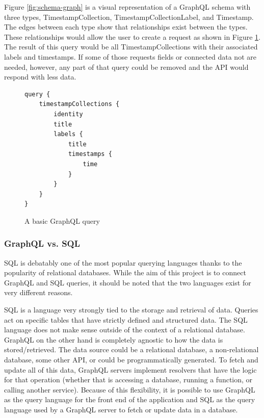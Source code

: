 Figure \ref{fig:schema-graph} is a visual representation of a GraphQL schema with three types, TimestampCollection, TimestampCollectionLabel, and Timestamp.  The edges between each type show that relationships exist between the types. These relationships  would allow the user to create a request as shown in Figure \ref{fig:basic-query}.  The result of this query would be all TimestampCollections with their associated labels and timestamps.  If some of those requests fields or connected data not are needed, however, any part of that query could be removed and the API would respond with less data.

\begin{figure}
    \begin{verbatim}
query {
    timestampCollections {
        identity
        title
        labels {
            title
            timestamps {
                time
            }
        }
    }
}
    \end{verbatim}
    \caption{A basic GraphQL query}
    \label{fig:basic-query}
\end{figure}

\subsubsection{GraphQL vs. SQL}

SQL is debatably one of the most popular querying languages thanks to the popularity of relational databases.  While the aim of this project is to connect GraphQL and SQL queries, it should be noted that the two languages exist for very different reasons.

SQL is a language very strongly tied to the storage and retrieval of data.  Queries act on specific tables that have strictly defined and structured data.  The SQL language does not make sense outside of the context of a relational database.  GraphQL on the other hand is completely agnostic to how the data is stored/retrieved.  The data source could be a relational database, a non-relational database, some other API, or could be programmatically generated. To fetch and update all of this data, GraphQL servers implement resolvers that have the logic for that operation (whether that is accessing a database, running a function, or calling another service).  Because of this flexibility, it is possible to use GraphQL as the query language for the front end of the application and SQL as the query language used by a GraphQL server to fetch or update data in a database.